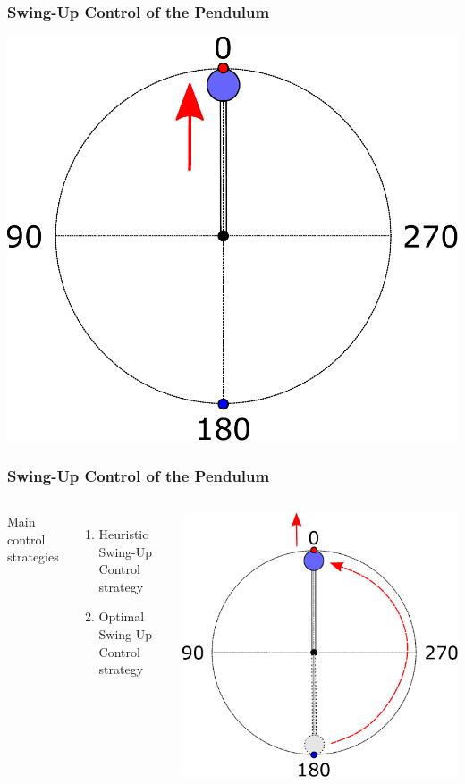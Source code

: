 \documentclass[]{beamer}
\begin{document}
\begin{frame}
	\frametitle{Swing-Up Control of the Pendulum}
	\centering 
	\includegraphics[scale=0.5]{images/OP4.pdf}
\end{frame}

\begin{frame}
	\frametitle{Swing-Up Control of the Pendulum}	
		\begin{columns}[c]	
		Main control strategies
		\begin{enumerate}
			\item Heuristic Swing-Up Control strategy\\
			\item Optimal Swing-Up Control strategy
		\end{enumerate}
	\includegraphics[scale=0.29]{images/OP_total.pdf}
\end{columns}
\end{frame}
\end{document}
